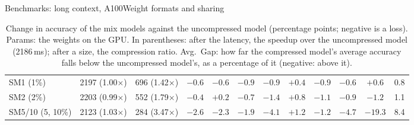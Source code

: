 \documentclass[aspectratio=169,10pt]{beamer}
\begin{document}
\begin{frame}{Benchmarks: long context, A100}{Weight formats and sharing}
\begin{table}
\begin{adjustbox}{width=\linewidth, totalheight=0.64\textheight, keepaspectratio, center}
\begin{tabular}{lccccccccccc}
SM1 (1\%) & 2197 (1.00$\times$) & 696 (1.42$\times$) & $-0.6$ & $-0.6$ & $-0.9$ & $-0.9$ & $+0.4$ & $-0.9$ & $-0.6$ & $+0.6$ & 0.8 \\
SM2 (2\%) & 2203 (0.99$\times$) & 552 (1.79$\times$) & $-0.4$ & $+0.2$ & $-0.7$ & $-1.4$ & $+0.8$ & $-1.1$ & $-0.9$ & $-1.2$ & 1.1 \\
SM5/10 (5, 10\%) & 2123 (1.03$\times$) & 284 (3.47$\times$) & $-2.6$ & $-2.3$ & $-1.9$ & $-4.1$ & $+1.2$ & $-1.2$ & $-4.7$ & $-19.3$ & 8.4 \\
\bottomrule
\end{tabular}
\end{adjustbox}
\caption{Change in accuracy of the mix models against the uncompressed model (percentage points; negative is a loss). Params: the weights on the GPU. In parentheses: after the latency, the speedup over the uncompressed model (2186\,ms); after a size, the compression ratio. Avg.\ Gap: how far the compressed model's average accuracy falls below the uncompressed model's, as a percentage of it (negative: above it).}\label{tab:turndelta}
\end{table}
\end{frame}
\end{document}
